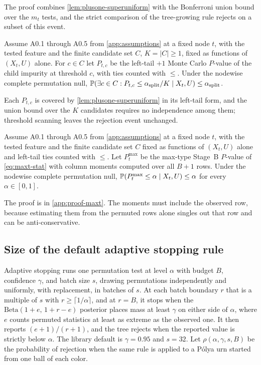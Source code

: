 The proof combines \cref{lem:plusone-superuniform} with the Bonferroni union
bound over the $m_t$ tests, and the strict comparison of the tree-growing rule
rejects on a subset of this event.

\begin{corollary}
\label{cor:stageB-bonferroni}
Assume A0.1 through A0.5 from \cref{app:assumptions} at a fixed node $t$, with
the tested feature and the finite candidate set $C$, $K = |C| \ge 1$, fixed as
functions of $(X_t,U)$ alone. For $c \in C$ let $P_{t,c}$ be the left-tail $+1$
Monte Carlo $P$-value of the child impurity at threshold $c$, with ties counted
with $\le$. Under the nodewise complete permutation null,
$\mathbb{P}(\exists c \in C : P_{t,c} \le \alpha_{\mathrm{split}}/K \mid X_t,U)
\le \alpha_{\mathrm{split}}$.
\end{corollary}

Each $P_{t,c}$ is covered by \cref{lem:plusone-superuniform} in its left-tail
form, and the union bound over the $K$ candidates requires no independence
among them; threshold scanning leaves the rejection event unchanged.

\begin{corollary}
\label{cor:stageB-maxt}
Assume A0.1 through A0.5 from \cref{app:assumptions} at a fixed node $t$, with
the tested feature and the finite candidate set $C$ fixed as functions of
$(X_t,U)$ alone and left-tail ties counted with $\le$. Let $P^{\max}_t$ be the
max-type Stage~B $P$-value of \cref{eq:maxt-stat} with column moments computed
over all $B+1$ rows. Under the nodewise complete permutation null,
$\mathbb{P}(P^{\max}_t \le \alpha \mid X_t,U) \le \alpha$ for every
$\alpha\in[0,1]$.
\end{corollary}

The proof is in \cref{app:proof-maxt}. The moments must include the observed
row, because estimating them from the permuted rows alone singles out that row
and can be anti-conservative.

\subsection{Size of the default adaptive stopping rule}
\label{sec:theory-adaptive}

Adaptive stopping runs one permutation test at level $\alpha$ with budget $B$,
confidence $\gamma$, and batch size $s$, drawing permutations independently and
uniformly, with replacement, in batches of $s$. At each batch boundary $r$ that
is a multiple of $s$ with $r \ge \lceil 1/\alpha \rceil$, and at $r=B$, it
stops when the $\mathrm{Beta}(1+e,\,1+r-e)$ posterior places mass at least
$\gamma$ on either side of $\alpha$, where $e$ counts permuted statistics at
least as extreme as the observed one. It then reports $(e+1)/(r+1)$, and the
tree rejects when the reported value is strictly below $\alpha$. The library
default is $\gamma=0.95$ and $s=32$. Let $\rho(\alpha,\gamma,s,B)$ be the
probability of rejection when the same rule is applied to a P\'olya urn started
from one ball of each color.

